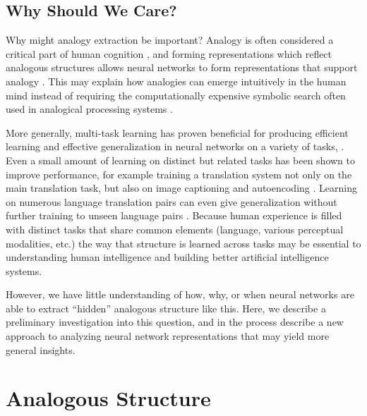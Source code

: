 \documentclass[10pt,letterpaper]{article}
\begin{document}
\subsection{Why Should We Care?}
Why might analogy extraction be important? Analogy is often considered a critical part of human cognition \cite[e.g.]{Gentner2003}, and forming representations which reflect analogous structures allows neural networks to form representations that support analogy \citep{Pennington2014,Kollias2013}. This may explain how analogies can emerge intuitively in the human mind instead of requiring the computationally expensive symbolic search often used in analogical processing systems \cite[e.g.]{Falkenhainer1989}. \par
More generally, multi-task learning has proven beneficial for producing efficient learning and effective generalization in neural networks on a variety of tasks, \cite[e.g.]{Dong2015,Rusu2015}. Even a small amount of learning on distinct but related tasks has been shown to improve performance, for example training a translation system not only on the main translation task, but also on image captioning and autoencoding \citep{Luong2016}. Learning on numerous language translation pairs can even give generalization without further training to unseen language pairs \citep{Johnson2016}. Because human experience is filled with distinct tasks that share common elements (language, various perceptual modalities, etc.) the way that structure is learned across tasks may be essential to understanding human intelligence and building better artificial intelligence systems.\par
However, we have little understanding of how, why, or when neural networks are able to extract ``hidden'' analogous structure like this. Here, we describe a preliminary investigation into this question, and in the process describe a new approach to analyzing neural network representations that may yield more general insights. 
\section{Analogous Structure}
\end{document}
